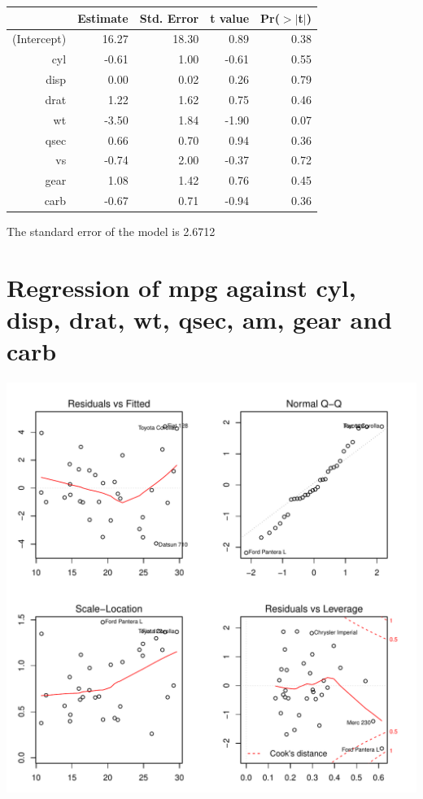 \documentclass{article}\usepackage[]{graphicx}\usepackage[]{color}
\makeatletter
\def\maxwidth{ %
  \ifdim\Gin@nat@width>\linewidth
    \linewidth
  \else
    \Gin@nat@width
  \fi
}
\newenvironment{knitrout}{}{} %
\makeatother
\begin{document}
\begin{table}[ht]
\centering
\begin{tabular}{rrrrr}
  \hline
 & Estimate & Std. Error & t value & Pr($>$$|$t$|$) \\ 
  \hline
(Intercept) & 16.27 & 18.30 & 0.89 & 0.38 \\ 
  cyl & -0.61 & 1.00 & -0.61 & 0.55 \\ 
  disp & 0.00 & 0.02 & 0.26 & 0.79 \\ 
  drat & 1.22 & 1.62 & 0.75 & 0.46 \\ 
  wt & -3.50 & 1.84 & -1.90 & 0.07 \\ 
  qsec & 0.66 & 0.70 & 0.94 & 0.36 \\ 
  vs & -0.74 & 2.00 & -0.37 & 0.72 \\ 
  gear & 1.08 & 1.42 & 0.76 & 0.45 \\ 
  carb & -0.67 & 0.71 & -0.94 & 0.36 \\ 
   \hline
\end{tabular}
\end{table}




The standard error of the model is 2.6712

\newpage

\section{Regression of mpg against cyl, disp, drat, wt, qsec, am, gear and carb }
\begin{knitrout}
\color{fgcolor}

{\centering \includegraphics[width=\maxwidth]{figure/lm-cyl-disp-drat-wt-qsec-am-gear-carb} 

}



\end{knitrout}
\end{document}
